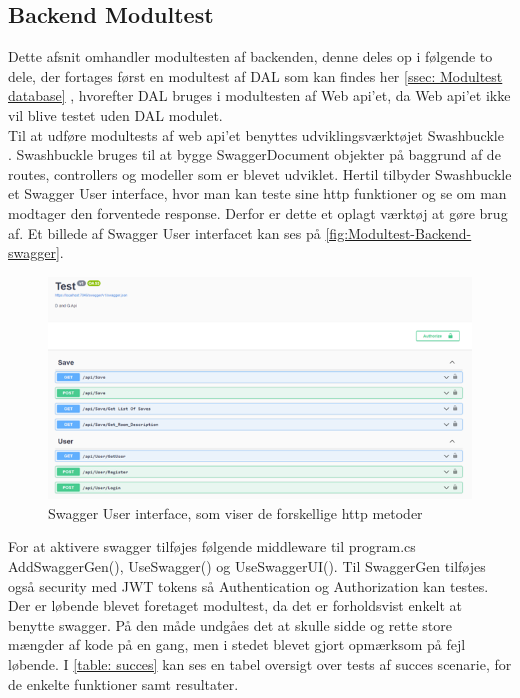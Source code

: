 \subsection{Backend Modultest}

Dette afsnit omhandler modultesten af backenden, denne deles op i følgende to dele, der fortages først en modultest af DAL som kan findes her \autoref{ssec: Modultest database} , hvorefter DAL bruges i modultesten af Web api’et, da Web api’et ikke vil blive testet uden DAL modulet.\\

Til at udføre modultests af web api’et benyttes udviklingsværktøjet Swashbuckle \cite{Swagger}. Swashbuckle bruges til at bygge SwaggerDocument objekter på baggrund af de routes, controllers og modeller som er blevet udviklet. Hertil tilbyder Swashbuckle et Swagger User interface, hvor man kan teste sine http funktioner og se om man modtager den forventede response. Derfor er dette et oplagt værktøj at gøre brug af. Et billede af Swagger User interfacet kan ses på \autoref{fig:Modultest-Backend-swagger}.\\

\begin{figure}[H]
\centering
\includegraphics[width = \textwidth]{02-Body/Images/Backend_swagger.PNG}
\caption{Swagger User interface, som viser de forskellige http metoder}
\label{fig:Modultest-Backend-swagger}
\end{figure}

For at aktivere swagger tilføjes følgende middleware til program.cs AddSwaggerGen(), UseSwagger() og UseSwaggerUI(). Til SwaggerGen tilføjes også security med JWT tokens så Authentication og Authorization kan testes.\\

Der er løbende blevet foretaget modultest, da det er forholdsvist enkelt at benytte swagger. På den måde undgåes det at skulle sidde og rette store mængder af kode på en gang, men i stedet blevet gjort opmærksom på fejl løbende. I \autoref{table: succes} kan ses en tabel oversigt over tests af succes scenarie, for de enkelte funktioner samt resultater.\\


